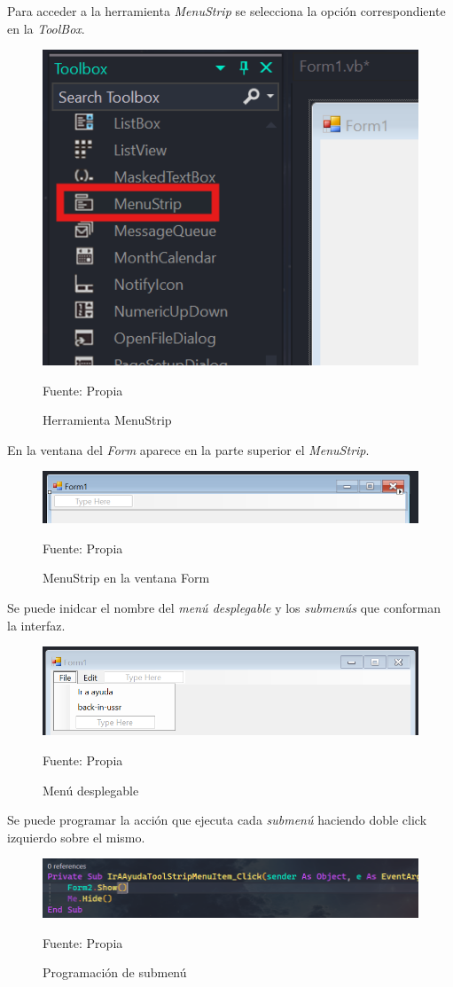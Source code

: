 Para acceder a la herramienta \emph{MenuStrip} se selecciona la opción correspondiente en la \emph{ToolBox}.

\begin{figure}[H]
  \centering
  \includegraphics[scale = 1]{Imagenes/manual_1.png}
  \caption{Herramienta MenuStrip}{Fuente: Propia}
\end{figure}

En la ventana del \emph{Form} aparece en la parte superior el \emph{MenuStrip}.

\begin{figure}[H]
  \centering
  \includegraphics[scale = 0.7]{Imagenes/manual_2.png}
  \caption{MenuStrip en la ventana Form}{Fuente: Propia}
\end{figure}

Se puede inidcar el nombre del \emph{menú desplegable} y los \emph{submenús} que conforman la interfaz.

\begin{figure}[htb]
  \centering
  \includegraphics[scale = 0.6]{Imagenes/manual_3.png}
  \caption{Menú desplegable}{Fuente: Propia}
\end{figure}

Se puede programar la acción que ejecuta cada \emph{submenú} haciendo doble click izquierdo sobre el mismo.

\begin{figure}[htb]
  \centering
  \includegraphics[scale = 0.6]{Imagenes/manual_4.png}
  \caption{Programación de submenú}{Fuente: Propia}
\end{figure}